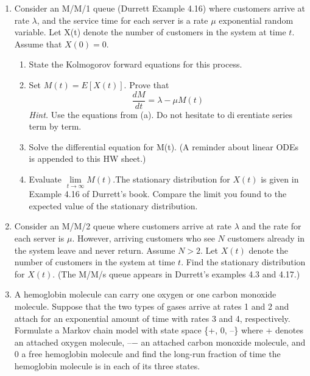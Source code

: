 \documentclass[12pt]{article}
\begin{document}

\begin{enumerate}
\item Consider an M/M/1 queue (Durrett Example 4.16) where customers arrive at rate $\lambda$, and the service time for each server is a rate $\mu$ exponential random variable. Let X(t) denote the number of customers in the system at time $t$. Assume that $X(0) = 0$.
\begin{enumerate}[label=(\alph*)]
    \item State the Kolmogorov forward equations for this process.
    \item Set $M(t) = E[X(t)]$. Prove that
    $$\frac{dM}{dt} = \lambda - \mu M(t)$$
    {\sl Hint.} Use the equations from (a). Do not hesitate to dierentiate series term by term.
    
    \item Solve the differential equation for M(t). (A reminder about linear ODEs is appended to this HW sheet.)
    
    \item Evaluate $\lim\limits_{t\to\infty} M(t)$.The stationary distribution for $X(t)$ is given in Example 4.16 of Durrett's book. Compare the limit you found to the expected value of the stationary distribution.
\end{enumerate}
    
\item Consider an M/M/2 queue where customers arrive at rate $\lambda$ and the rate for each server
is $\mu$. However, arriving customers who see $N$ customers already in the system leave and
never return. Assume $N > 2$. Let $X(t)$ denote the number of customers in the system at
time $t$. Find the stationary distribution for $X(t)$. (The M/M/s queue appears in Durrett's
examples 4.3 and 4.17.)

\item A hemoglobin molecule can carry one oxygen or one carbon monoxide molecule. Suppose that the two types of gases arrive at rates 1 and 2 and attach for an exponential amount of time with rates 3 and 4, respectively. Formulate a Markov chain model with state space \{+, 0, \---\} where + denotes an attached oxygen molecule, \---− an attached carbon monoxide molecule, and 0 a free hemoglobin molecule and find the long-run fraction of time the hemoglobin molecule is in each of its three states.


\end{enumerate}
\end{document}
